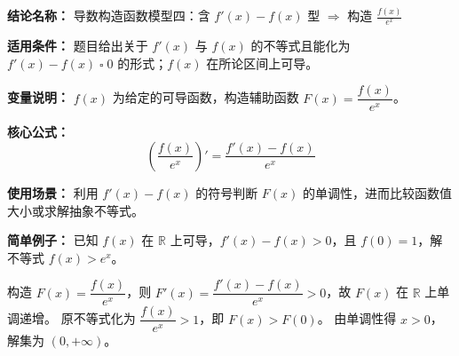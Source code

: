 \textbf{结论名称：} 导数构造函数模型四：含 \( f'(x)-f(x) \) 型 \(\Rightarrow\) 构造 \(\displaystyle\frac{f(x)}{e^x}\)

\textbf{适用条件：} 题目给出关于 \( f'(x) \) 与 \( f(x) \) 的不等式且能化为 \( f'(x)-f(x)\;\square\;0 \) 的形式；\( f(x) \) 在所论区间上可导。

\textbf{变量说明：} \( f(x) \) 为给定的可导函数，构造辅助函数 \( F(x)=\dfrac{f(x)}{e^x} \)。

\textbf{核心公式：}
\[
\boxed{\left( \frac{f(x)}{e^x} \right)' = \frac{f'(x)-f(x)}{e^x}}
\]

\textbf{使用场景：} 利用 \( f'(x)-f(x) \) 的符号判断 \( F(x) \) 的单调性，进而比较函数值大小或求解抽象不等式。

\textbf{简单例子：} 已知 \( f(x) \) 在 \(\mathbb{R}\) 上可导，\( f'(x)-f(x)>0 \)，且 \( f(0)=1 \)，解不等式 \( f(x)>e^x \)。

构造 \( F(x)=\dfrac{f(x)}{e^x} \)，则 \( F'(x)=\dfrac{f'(x)-f(x)}{e^x}>0 \)，故 \( F(x) \) 在 \(\mathbb{R}\) 上单调递增。
原不等式化为 \(\dfrac{f(x)}{e^x}>1\)，即 \( F(x)>F(0) \)。
由单调性得 \( x>0 \)，解集为 \((0,+\infty)\)。